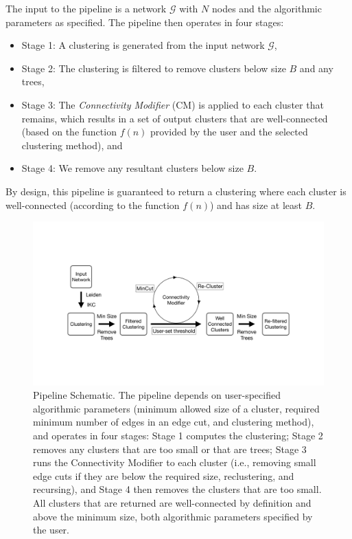 \documentclass[11pt]{article}   	%
\begin{document}
\noindent
The input to the pipeline is a network $\mathcal{G}$ with $N$ nodes and the algorithmic parameters as specified.
The pipeline then operates in four stages:
\begin{itemize}
\item
Stage 1: A clustering is generated  from the input network $\mathcal{G}$,
\item Stage 2: The clustering is filtered  to remove clusters below size $B$  and any trees,
\item Stage 3: The \emph{Connectivity Modifier} (CM) is applied to each cluster that remains, which results in a set of output clusters that are well-connected (based on the function $f(n)$ provided by the user and the selected clustering method), and
\item Stage 4: We remove any resultant clusters below size $B$.
\end{itemize}
By design, this pipeline is guaranteed to return a clustering where each cluster is well-connected (according to the function $f(n)$)  and has size at least $B$.

\begin{figure}[H]
\centering
\includegraphics[width=0.8\linewidth]{figs/workflow.pdf}
\caption{Pipeline Schematic. The pipeline depends on user-specified algorithmic parameters (minimum allowed size of a cluster, required minimum number of edges in an edge cut, and clustering method), and operates in four stages:  Stage 1 computes the clustering; Stage 2 removes any clusters that are too small or that are trees;  Stage 3 runs the  Connectivity Modifier to each cluster (i.e., removing small edge cuts if they are below the required size, reclustering, and recursing),  and Stage 4 then removes the clusters that are too small. All clusters that are returned are well-connected by definition and above the minimum size, both algorithmic parameters specified by the user.}
\end{figure}
\end{document}
